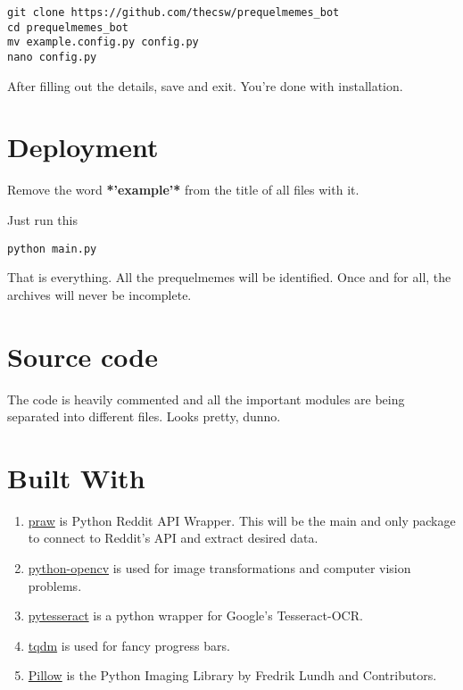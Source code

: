 \documentclass[11pt]{article}
\begin{document}
\begin{verbatim}
git clone https://github.com/thecsw/prequelmemes_bot
cd prequelmemes_bot
mv example.config.py config.py
nano config.py
\end{verbatim}

After filling out the details, save and exit. You're done with installation.

\section{Deployment}
\label{sec-3}

Remove the word \textbf{*'example'*} from the title of all files with it.

Just run this

\begin{verbatim}
python main.py
\end{verbatim}

That is everything. All the prequelmemes will be identified. Once and for all,
the archives will never be incomplete.

\section{Source code}
\label{sec-4}

The code is heavily commented and all the important modules are being separated into different files. Looks pretty, dunno.

\section{Built With}
\label{sec-5}
\begin{enumerate}
\item \href{https://github.com/praw-dev/praw}{praw} is Python Reddit API Wrapper. This will be the main and only package to
connect to Reddit's API and extract desired data.
\item \href{https://pypi.python.org/pypi/opencv-python}{python-opencv} is used for image transformations and computer vision problems.
\item \href{https://pypi.python.org/pypi/pytesseract}{pytesseract} is a python wrapper for Google's Tesseract-OCR.
\item \href{https://pypi.python.org/pypi/tqdm}{tqdm} is used for fancy progress bars.
\item \href{https://pillow.readthedocs.io/en/latest/}{Pillow} is the Python  Imaging Library by Fredrik Lundh and Contributors.
\end{enumerate}
\end{document}
